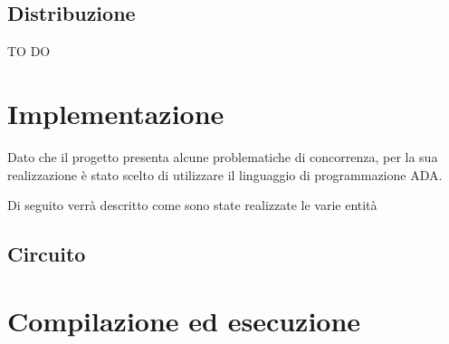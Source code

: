\documentclass[a4paper,11pt, twoside]{book}
\begin{document}
    \section{Distribuzione}
        \<TO DO\>
        
  \chapter{Implementazione}
    Dato che il progetto presenta alcune problematiche di concorrenza, per la sua realizzazione è stato scelto
    di utilizzare il linguaggio di programmazione ADA.
    
    Di seguito verrà descritto come sono state realizzate le varie entità
    
    \section{Circuito}
      
  
  \chapter{Compilazione ed esecuzione}
\end{document}
